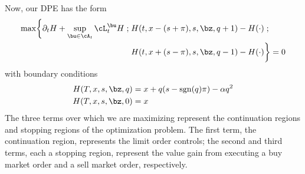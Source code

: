 \documentclass[12pt]{article}
\begin{document}
Now, our DPE has the form
\begin{equation}\label{eq:DPEmaxprofit}
\begin{split}
\max \biggl\lbrace \partial_t H + \sup \limits_{\bu \in \cA_t} \cL^{\bu}_t H \; ; \; & H(t,x-(s+\pi), s, \bz, q+1) - H(\cdot) \; ; \\
&  H(t,x+(s-\pi), s, \bz, q-1) - H(\cdot) \biggr\rbrace = 0
\end{split}
\end{equation}
with boundary conditions
\begin{align}
H(T, x, s, \bz, q) & = x + q(s - \mathrm{sgn}(q)\pi) - \alpha q^2 \\
H(T, x, s, \bz, 0) & = x
\end{align}
The three terms over which we are maximizing represent the continuation regions and stopping regions of the optimization problem. The first term, the continuation region, represents the limit order controls; the second and third terms, each a stopping region, represent the value gain from executing a buy market order and a sell market order, respectively.
\end{document}
